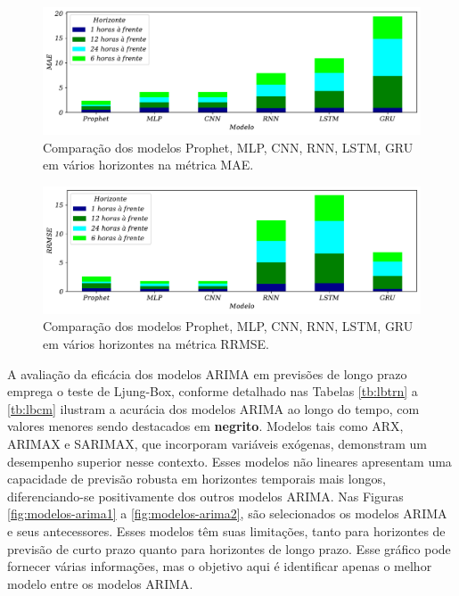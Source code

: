 \begin{figure}[H]
	\centering
	\caption{Comparação dos modelos Prophet, MLP, CNN, RNN, LSTM, GRU em vários horizontes na métrica MAE.}\label{fig:modelos-red}
	\includegraphics[width=0.9\linewidth]{Resultados/Figuras/mae_comparar}
	
	
\end{figure}



\begin{figure}[H]
	\centering
	\caption{Comparação dos modelos Prophet, MLP, CNN, RNN, LSTM, GRU em vários horizontes na métrica RRMSE.}\label{fig:modelos-red2}
	\includegraphics[width=0.9\linewidth]{Resultados/Figuras/rrmse_comparar}
	
	
\end{figure}

A avaliação da eficácia dos modelos ARIMA em previsões de longo prazo emprega o teste de Ljung-Box, conforme detalhado nas Tabelas \ref{tb:lbtrn} a \ref{tb:lbcm} ilustram a acurácia dos modelos ARIMA ao longo do tempo, com valores menores sendo destacados em \textbf{negrito}. Modelos tais como ARX, ARIMAX e SARIMAX, que incorporam variáveis exógenas, demonstram um desempenho superior nesse contexto. Esses modelos não lineares apresentam uma capacidade de previsão robusta em horizontes temporais mais longos, diferenciando-se positivamente dos outros modelos ARIMA. Nas Figuras \ref{fig:modelos-arima1} a \ref{fig:modelos-arima2}, são selecionados os modelos ARIMA e seus antecessores. Esses modelos têm suas limitações, tanto para horizontes de previsão de curto prazo quanto para horizontes de longo prazo. Esse gráfico pode fornecer várias informações, mas o objetivo aqui é identificar apenas o melhor modelo entre os modelos ARIMA.


